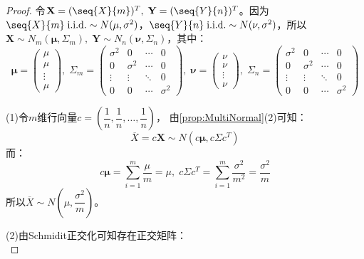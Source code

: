 \begin{proof}
	令$\mathbf{X}=(\seq{X}{m})^T,\;\mathbf{Y}=(\seq{Y}{n})^T$。因为$\seq{X}{m}\;\text{i.i.d.}\sim N(\mu,\sigma^2)$，$\seq{Y}{n}\;\text{i.i.d.}\sim N(\nu,\sigma^2)$，所以$\mathbf{X}\sim N_m(\boldsymbol{\mu},\Sigma_m),\;\mathbf{Y}\sim N_n(\boldsymbol{\nu},\Sigma_n)$，其中：
	\begin{equation*}
		\boldsymbol{\mu}=
		\begin{pmatrix}
			\mu \\
			\mu \\
			\vdots \\
			\mu
		\end{pmatrix},\;
		\Sigma_m=
		\begin{pmatrix}
			\sigma^2 & 0 & \cdots & 0 \\
			0 & \sigma^2 & \cdots & 0 \\
			\vdots & \vdots & \ddots & 0 \\
			0 & 0 & \cdots & \sigma^2
		\end{pmatrix},\;
			\boldsymbol{\nu}=
		\begin{pmatrix}
			\nu \\
			\nu \\
			\vdots \\
			\nu
		\end{pmatrix},\;
		\Sigma_n=
		\begin{pmatrix}
			\sigma^2 & 0 & \cdots & 0 \\
			0 & \sigma^2 & \cdots & 0 \\
			\vdots & \vdots & \ddots & 0 \\
			0 & 0 & \cdots & \sigma^2
		\end{pmatrix}
	\end{equation*}
	\par
	(1)令$m$维行向量$c=\left(\dfrac{1}{n},\dfrac{1}{n},\dots,\dfrac{1}{n}\right)$，
	由\cref{prop:MultiNormal}(2)可知：
	\begin{equation*}
		\overline{X}=c\mathbf{X}\sim N(c\boldsymbol{\mu},c\Sigma c^T)
	\end{equation*}
	而：
	\begin{equation*}
		c\boldsymbol{\mu}=\sum_{i=1}^{m}\frac{\mu}{m}=\mu,\;c\Sigma c^T=\sum_{i=1}^{m}\frac{\sigma^2}{m^2}=\frac{\sigma^2}{m}
	\end{equation*}
	所以$\overline{X}\sim N\left(\mu,\dfrac{\sigma^2}{m}\right)$。\par
	(2)由Schmidit正交化可知存在正交矩阵：
	\begin{equation*}

\end{equation*}
\end{proof}
